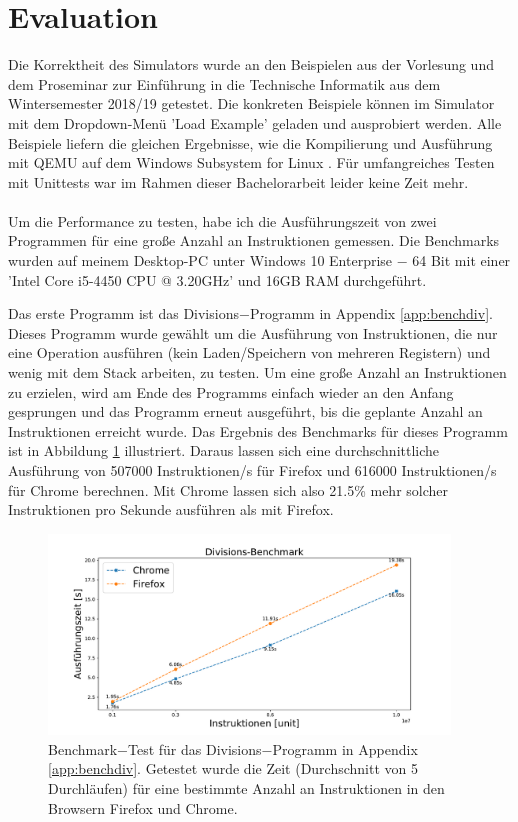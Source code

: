 \documentclass[a4paper, 11pt, onecolumn]{article}
\begin{document}
\newpage
\section{Evaluation}

Die Korrektheit des Simulators wurde an den Beispielen aus der Vorlesung und dem Proseminar zur Einführung in die Technische Informatik aus dem Wintersemester 2018/19 getestet. Die konkreten Beispiele können im Simulator mit dem Dropdown-Menü 'Load Example' geladen und ausprobiert werden. Alle Beispiele liefern die gleichen Ergebnisse, wie die Kompilierung und Ausführung mit QEMU \cite{qemu} auf dem Windows Subsystem for Linux \cite{wsl}. Für umfangreiches Testen mit Unittests war im Rahmen dieser Bachelorarbeit leider keine Zeit mehr.\\ \\
Um die Performance zu testen, habe ich die Ausführungszeit von zwei Programmen für eine große Anzahl an Instruktionen gemessen. Die Benchmarks wurden auf meinem Desktop-PC unter Windows 10 Enterprise $-$ 64 Bit mit einer 'Intel Core i5-4450 CPU @ 3.20GHz' und 16GB RAM durchgeführt.

Das erste Programm ist das Divisions$-$Programm in Appendix \ref{app:benchdiv}. Dieses Programm wurde gewählt um die Ausführung von Instruktionen, die nur eine Operation ausführen (kein Laden/Speichern von mehreren Registern) und wenig mit dem Stack arbeiten, zu testen. Um eine große Anzahl an Instruktionen zu erzielen, wird am Ende des Programms einfach wieder an den Anfang gesprungen und das Programm erneut ausgeführt, bis die geplante Anzahl an Instruktionen erreicht wurde. Das Ergebnis des Benchmarks für dieses Programm ist in Abbildung \ref{fig:benchmarkDiv} illustriert. Daraus lassen sich eine durchschnittliche Ausführung von 507000 Instruktionen/s für Firefox und 616000 Instruktionen/s für Chrome berechnen. Mit Chrome lassen sich also 21.5\% mehr solcher Instruktionen pro Sekunde ausführen als mit Firefox.

\begin{figure}[!htb]
    \centering  
    \includegraphics[width=0.95\textwidth]{data/divisionBenchmark}
    \caption{Benchmark$-$Test für das Divisions$-$Programm in Appendix \ref{app:benchdiv}. Getestet wurde die Zeit (Durchschnitt von 5 Durchläufen) für eine bestimmte Anzahl an Instruktionen in den Browsern Firefox und Chrome.}
    \label{fig:benchmarkDiv}
\end{figure}
\end{document}
